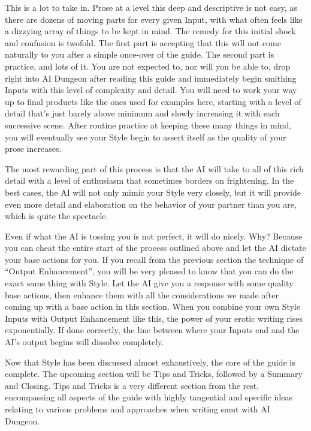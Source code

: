 \documentclass[Source-main.tex]{subfiles}
\begin{document}
This is a lot to take in.
Prose at a level this deep and descriptive is not easy, as there are dozens of moving parts for every given Input, with what often feels like a dizzying array of things to be kept in mind.
The remedy for this initial shock and confusion is twofold.
The first part is accepting that this will not come naturally to you after a simple once-over of the guide.
The second part is practice, and lots of it.
You are not expected to, nor will you be able to, drop right into AI Dungeon after reading this guide and immediately begin smithing Inputs with this level of complexity and detail.
You will need to work your way up to final products like the ones used for examples here, starting with a level of detail that’s just barely above minimum and slowly increasing it with each successive scene.
After routine practice at keeping these many things in mind, you will eventually see your Style begin to assert itself as the quality of your prose increases.

The most rewarding part of this process is that the AI will take to all of this rich detail with a level of enthusiasm that sometimes borders on frightening.
In the best cases, the AI will not only mimic your Style very closely, but it will provide even more detail and elaboration on the behavior of your partner than you are, which is quite the spectacle.

Even if what the AI is tossing you is not perfect, it will do nicely.
Why?
Because you can cheat the entire start of the process outlined above and let the AI dictate your base actions for you.
If you recall from the previous section the technique of “Output Enhancement”, you will be very pleased to know that you can do the exact same thing with Style.
Let the AI give you a response with some quality base actions, then enhance them with all the considerations we made after coming up with a base action in this section.
When you combine your own Style Inputs with Output Enhancement like this, the power of your erotic writing rises exponentially.
If done correctly, the line between where your Inputs end and the AI’s output begins will dissolve completely.

Now that Style has been discussed almost exhaustively, the core of the guide is complete.
The upcoming section will be Tips and Tricks, followed by a Summary and Closing.
Tips and Tricks is a very different section from the rest, encompassing all aspects of the guide with highly tangential and specific ideas relating to various problems and approaches when writing smut with AI Dungeon.
\end{document}
